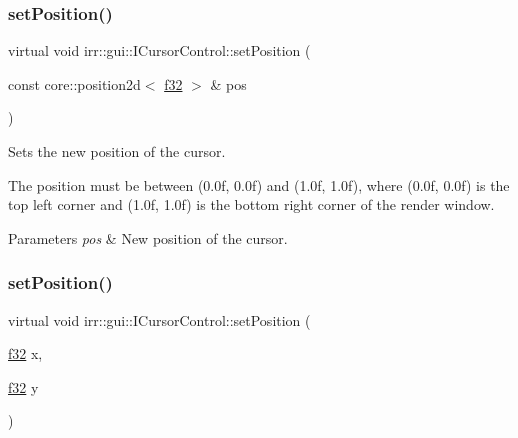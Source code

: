 \subsubsection{\texorpdfstring{set\+Position()}{setPosition()}\hspace{0.1cm}{\footnotesize\ttfamily [1/4]}}
{\footnotesize\ttfamily virtual void irr\+::gui\+::\+I\+Cursor\+Control\+::set\+Position (\begin{DoxyParamCaption}\item[{const core\+::position2d$<$ \hyperlink{namespaceirr_a0277be98d67dc26ff93b1a6a1d086b07}{f32} $>$ \&}]{pos }\end{DoxyParamCaption})\hspace{0.3cm}{\ttfamily [pure virtual]}}



Sets the new position of the cursor. 

The position must be between (0.\+0f, 0.\+0f) and (1.\+0f, 1.\+0f), where (0.\+0f, 0.\+0f) is the top left corner and (1.\+0f, 1.\+0f) is the bottom right corner of the render window. 
\begin{DoxyParams}{Parameters}
{\em pos} & New position of the cursor. \\
\hline
\end{DoxyParams}
\mbox{\label{classirr_1_1gui_1_1ICursorControl_adca41054684f73435c9b045520f7c83b}} 
\subsubsection{\texorpdfstring{set\+Position()}{setPosition()}\hspace{0.1cm}{\footnotesize\ttfamily [2/4]}}
{\footnotesize\ttfamily virtual void irr\+::gui\+::\+I\+Cursor\+Control\+::set\+Position (\begin{DoxyParamCaption}\item[{\hyperlink{namespaceirr_a0277be98d67dc26ff93b1a6a1d086b07}{f32}}]{x,  }\item[{\hyperlink{namespaceirr_a0277be98d67dc26ff93b1a6a1d086b07}{f32}}]{y }\end{DoxyParamCaption})\hspace{0.3cm}{\ttfamily [pure virtual]}}



